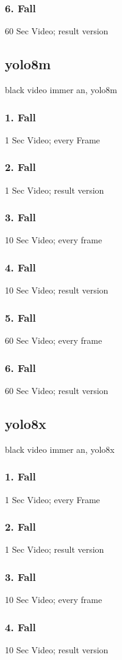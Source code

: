 \subsubsection{6. Fall} {60 Sec Video; result version}
\subsection{yolo8m}
{black video immer an, yolo8m}
\subsubsection{1. Fall} {1 Sec Video; every Frame}
\subsubsection{2. Fall} {1 Sec Video; result version}
\subsubsection{3. Fall} {10 Sec Video; every frame}
\subsubsection{4. Fall} {10 Sec Video; result version}
\subsubsection{5. Fall} {60 Sec Video; every frame}
\subsubsection{6. Fall} {60 Sec Video; result version}
\subsection{yolo8x}
{black video immer an, yolo8x}
\subsubsection{1. Fall} {1 Sec Video; every Frame}
\subsubsection{2. Fall} {1 Sec Video; result version}
\subsubsection{3. Fall} {10 Sec Video; every frame}
\subsubsection{4. Fall} {10 Sec Video; result version}
